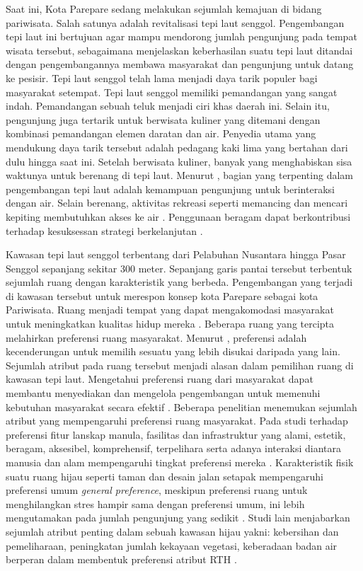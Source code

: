 \documentclass[12pt,oneside]{udthesis}
\begin{document}
Saat ini, Kota Parepare sedang melakukan sejumlah kemajuan di bidang pariwisata. Salah satunya adalah revitalisasi tepi laut senggol.
Pengembangan tepi laut ini bertujuan agar mampu mendorong jumlah pengunjung pada tempat wisata tersebut, sebagaimana \cite{hoyle2001} menjelaskan keberhasilan suatu tepi laut ditandai dengan pengembangannya membawa masyarakat dan pengunjung untuk datang ke pesisir.
Tepi laut senggol telah lama menjadi daya tarik populer bagi masyarakat setempat. Tepi laut senggol memiliki pemandangan yang sangat indah. Pemandangan sebuah teluk menjadi ciri khas daerah ini. Selain itu, pengunjung juga tertarik untuk berwisata kuliner yang ditemani dengan kombinasi pemandangan elemen daratan dan air. Penyedia utama yang mendukung daya tarik tersebut adalah pedagang kaki lima yang bertahan dari dulu hingga saat ini. Setelah berwisata kuliner, banyak yang menghabiskan sisa waktunya untuk berenang di tepi laut. Menurut \cite{davidowich1998}, bagian yang terpenting dalam pengembangan tepi laut adalah kemampuan pengunjung untuk berinteraksi dengan air. Selain berenang, aktivitas rekreasi seperti memancing dan mencari kepiting membutuhkan akses ke air \citep{gordon1996}. Penggunaan beragam dapat berkontribusi terhadap kesuksessan strategi berkelanjutan \citep{eldeeb2015}.

Kawasan tepi laut senggol terbentang dari Pelabuhan Nusantara hingga Pasar Senggol sepanjang sekitar 300 meter. Sepanjang garis pantai tersebut terbentuk sejumlah ruang dengan karakteristik yang berbeda. Pengembangan yang terjadi di kawasan tersebut untuk merespon konsep kota Parepare sebagai kota Pariwisata.
Ruang menjadi tempat yang dapat mengakomodasi masyarakat untuk meningkatkan kualitas hidup mereka \citep{kim2012}. Beberapa ruang yang tercipta melahirkan preferensi ruang masyarakat. Menurut \cite{devysandra2012}, preferensi adalah kecenderungan untuk memilih sesuatu yang lebih disukai daripada yang lain. Sejumlah atribut pada ruang tersebut menjadi alasan dalam pemilihan ruang di kawasan tepi laut.
Mengetahui preferensi ruang dari masyarakat dapat membantu menyediakan dan mengelola pengembangan untuk memenuhi kebutuhan masyarakat secara efektif \citep{madureira2018}.
Beberapa penelitian menemukan sejumlah atribut yang mempengaruhi preferensi ruang masyarakat. Pada studi terhadap preferensi fitur lanskap manula, fasilitas dan infrastruktur yang alami, estetik, beragam, aksesibel, komprehensif, terpelihara serta adanya interaksi diantara manusia dan alam mempengaruhi tingkat preferensi mereka \citep{wen2018}. Karakteristik fisik suatu ruang hijau seperti taman dan desain jalan setapak mempengaruhi preferensi umum \textit{general preference}, meskipun preferensi ruang untuk menghilangkan stres hampir sama dengan preferensi umum, ini lebih mengutamakan pada jumlah pengunjung yang sedikit \citep{arnberger2015}. Studi lain menjabarkan sejumlah atribut penting dalam sebuah kawasan hijau yakni: kebersihan dan pemeliharaan, peningkatan jumlah kekayaan vegetasi, keberadaan badan air berperan dalam membentuk preferensi atribut RTH \citep{madureira2018}.
\end{document}
